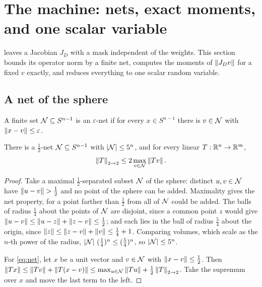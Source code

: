 \section{The machine: nets, exact moments, and one scalar variable}
\label{sec:moments}

 leaves a Jacobian $J_D$ with a mask independent of the weights. This section bounds its operator norm by a finite net, computes the moments of $\left\lVert J_Dv\right\rVert$ for a fixed $v$ exactly, and reduces everything to one scalar random variable.

\subsection{A net of the sphere}

\begin{definition}
A finite set $\mathcal{N}\subseteq S^{n-1}$ is an $\varepsilon$-net if for every $x\in S^{n-1}$ there is $v\in\mathcal{N}$ with $\left\lVert x-v\right\rVert\le\varepsilon$.
\end{definition}

\begin{lemma}\label{lem:net}
There is a $\tfrac12$-net $\mathcal{N}\subseteq S^{n-1}$ with $\left\lvert \mathcal{N}\right\rvert\le 5^n$, and for every linear $T:\mathbb{R}^n\to\mathbb{R}^m$,
\begin{equation}\label{eq:net}
\left\lVert T\right\rVert_{2\to 2}\le 2\max_{v\in\mathcal{N}}\left\lVert Tv\right\rVert.
\end{equation}
\end{lemma}

\begin{proof}
Take a maximal $\tfrac12$-separated subset $\mathcal{N}$ of the sphere: distinct $u,v\in\mathcal{N}$ have $\left\lVert u-v\right\rVert>\tfrac12$ and no point of the sphere can be added. Maximality gives the net property, for a point farther than $\tfrac12$ from all of $\mathcal{N}$ could be added. The balls of radius $\tfrac14$ about the points of $\mathcal{N}$ are disjoint, since a common point $z$ would give $\left\lVert u-v\right\rVert\le\left\lVert u-z\right\rVert+\left\lVert z-v\right\rVert\le\tfrac12$; and each lies in the ball of radius $\tfrac54$ about the origin, since $\left\lVert z\right\rVert\le\left\lVert z-v\right\rVert+\left\lVert v\right\rVert\le\tfrac14+1$. Comparing volumes, which scale as the $n$-th power of the radius, $\left\lvert \mathcal{N}\right\rvert\,(\tfrac14)^n\le(\tfrac54)^n$, so $\left\lvert \mathcal{N}\right\rvert\le 5^n$.

For \cref{eq:net}, let $x$ be a unit vector and $v\in\mathcal{N}$ with $\left\lVert x-v\right\rVert\le\tfrac12$. Then $\left\lVert Tx\right\rVert\le\left\lVert Tv\right\rVert+\left\lVert T(x-v)\right\rVert\le\max_{u\in\mathcal{N}}\left\lVert Tu\right\rVert+\tfrac12\left\lVert T\right\rVert_{2\to 2}$. Take the supremum over $x$ and move the last term to the left.
\end{proof}

